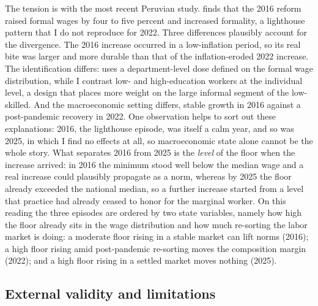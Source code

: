 The tension is with the most recent Peruvian study. \citet{jimenez_2023} finds that the 2016
reform raised formal wages by four to five percent and increased formality, a lighthouse
pattern that I do not reproduce for 2022. Three differences plausibly account for the
divergence. The 2016 increase occurred in a low-inflation period, so its real bite was larger
and more durable than that of the inflation-eroded 2022 increase. The identification differs:
\citet{jimenez_2023} uses a department-level dose defined on the formal wage distribution,
while I contrast low- and high-education workers at the individual level, a design that places
more weight on the large informal segment of the low-skilled. And the macroeconomic setting
differs, stable growth in 2016 against a post-pandemic recovery in 2022. One
observation helps to sort out these explanations: 2016, the lighthouse episode, was itself
a calm year, and so was 2025, in which I find no effects at all, so macroeconomic
state alone cannot be the whole story. What separates 2016 from 2025 is the
\emph{level} of the floor when the increase arrived: in 2016 the minimum stood well
below the median wage and a real increase could plausibly propagate as a norm, whereas
by 2025 the floor already exceeded the national median, so a further increase started
from a level that practice had already ceased to honor for the marginal worker. On
this reading the three episodes are ordered by two state variables, namely how high
the floor already sits in the wage distribution and how much re-sorting the labor
market is doing: a moderate floor rising in a stable market can lift norms (2016); a high
floor rising amid post-pandemic re-sorting moves the composition margin (2022); and a
high floor rising in a settled market moves nothing (2025).

\subsection{External validity and limitations}

